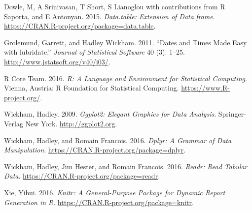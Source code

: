 \documentclass[]{article}
\begin{document}
\hypertarget{refs}{}
\hypertarget{ref-data.table}{}
Dowle, M, A Srinivasan, T Short, S Lianoglou with contributions from R
Saporta, and E Antonyan. 2015. \emph{Data.table: Extension of
Data.frame}. \url{https://CRAN.R-project.org/package=data.table}.

\hypertarget{ref-lubridate}{}
Grolemund, Garrett, and Hadley Wickham. 2011. ``Dates and Times Made
Easy with lubridate.'' \emph{Journal of Statistical Software} 40 (3):
1--25. \url{http://www.jstatsoft.org/v40/i03/}.

\hypertarget{ref-baseR}{}
R Core Team. 2016. \emph{R: A Language and Environment for Statistical
Computing}. Vienna, Austria: R Foundation for Statistical Computing.
\url{https://www.R-project.org/}.

\hypertarget{ref-ggplot2}{}
Wickham, Hadley. 2009. \emph{Ggplot2: Elegant Graphics for Data
Analysis}. Springer-Verlag New York. \url{http://ggplot2.org}.

\hypertarget{ref-dplyr}{}
Wickham, Hadley, and Romain Francois. 2016. \emph{Dplyr: A Grammar of
Data Manipulation}. \url{https://CRAN.R-project.org/package=dplyr}.

\hypertarget{ref-readr}{}
Wickham, Hadley, Jim Hester, and Romain Francois. 2016. \emph{Readr:
Read Tabular Data}. \url{https://CRAN.R-project.org/package=readr}.

\hypertarget{ref-knitr}{}
Xie, Yihui. 2016. \emph{Knitr: A General-Purpose Package for Dynamic
Report Generation in R}. \url{https://CRAN.R-project.org/package=knitr}.
\end{document}
